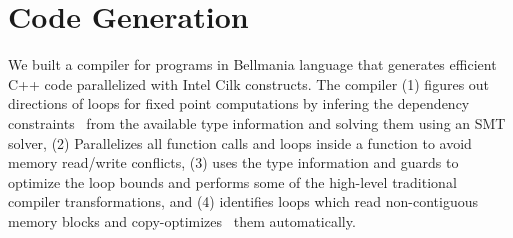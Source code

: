 \section{Code Generation}
We built a compiler for programs in Bellmania language that generates efficient C++ code parallelized with Intel Cilk constructs. The compiler (1) figures out directions of loops for fixed point computations by infering the dependency constraints~\cite{JACM1967} from the available type information and solving them using an SMT solver, (2) Parallelizes all function calls and loops inside a function to avoid memory read/write conflicts, (3) uses the type information and guards to optimize the loop bounds and performs some of the high-level traditional compiler transformations, and (4) identifies  loops which read non-contiguous memory blocks and copy-optimizes~\cite{ASPLOS1991} them automatically.  

 

